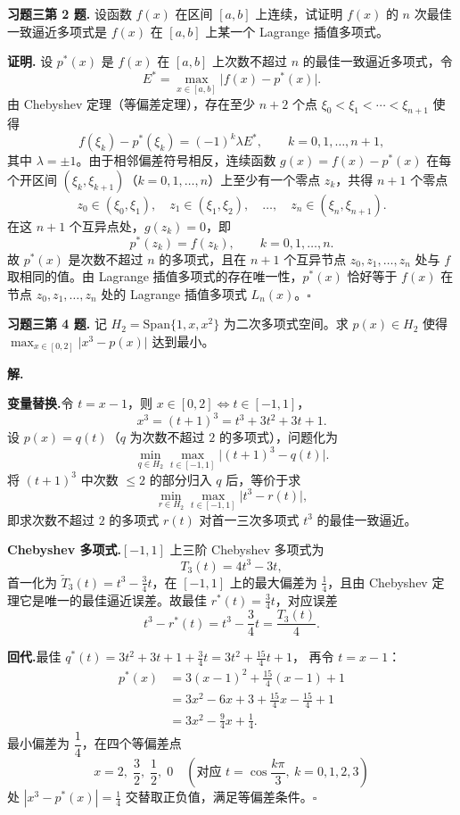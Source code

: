 \documentclass[UTF8,a4paper,11pt]{ctexart}
\newcommand*{\QED}{\hfill\ensuremath{\square}}
\begin{document}
\noindent\textbf{习题三\quad 第 2 题.}\quad
设函数 $f(x)$ 在区间 $[a,b]$ 上连续，试证明 $f(x)$ 的 $n$ 次最佳一致逼近多项式是 $f(x)$ 在 $[a,b]$ 上某一个 Lagrange 插值多项式。

\medskip
\noindent\textbf{证明.}\quad
设 $p^*(x)$ 是 $f(x)$ 在 $[a,b]$ 上次数不超过 $n$ 的最佳一致逼近多项式，令
\[
  E^*=\max_{x\in[a,b]}\bigl|f(x)-p^*(x)\bigr|.
\]
由 Chebyshev 定理（等偏差定理），存在至少 $n+2$ 个点 $\xi_0<\xi_1<\cdots<\xi_{n+1}$ 使得
\[
  f(\xi_k)-p^*(\xi_k)=(-1)^k\lambda E^*,\qquad k=0,1,\ldots,n+1,
\]
其中 $\lambda=\pm 1$。由于相邻偏差符号相反，连续函数 $g(x)=f(x)-p^*(x)$ 在每个开区间 $(\xi_k,\xi_{k+1})$（$k=0,1,\ldots,n$）上至少有一个零点 $z_k$，共得 $n+1$ 个零点
\[
  z_0\in(\xi_0,\xi_1),\quad z_1\in(\xi_1,\xi_2),\quad\ldots,\quad z_n\in(\xi_n,\xi_{n+1}).
\]
在这 $n+1$ 个互异点处，$g(z_k)=0$，即
\[
  p^*(z_k)=f(z_k),\qquad k=0,1,\ldots,n.
\]
故 $p^*(x)$ 是次数不超过 $n$ 的多项式，且在 $n+1$ 个互异节点 $z_0,z_1,\ldots,z_n$ 处与 $f$ 取相同的值。由 Lagrange 插值多项式的存在唯一性，$p^*(x)$ 恰好等于 $f(x)$ 在节点 $z_0,z_1,\ldots,z_n$ 处的 Lagrange 插值多项式 $L_n(x)$。\QED

\bigskip\bigskip

\noindent\textbf{习题三\quad 第 4 题.}\quad
记 $H_2=\mathrm{Span}\{1,x,x^2\}$ 为二次多项式空间。求 $p(x)\in H_2$ 使得
$\max_{x\in[0,2]}\bigl|x^3-p(x)\bigr|$ 达到最小。

\medskip
\noindent\textbf{解.}\quad

\noindent\textbf{变量替换.}\quad 令 $t=x-1$，则 $x\in[0,2]\Leftrightarrow t\in[-1,1]$，
\[
  x^3=(t+1)^3=t^3+3t^2+3t+1.
\]
设 $p(x)=q(t)$（$q$ 为次数不超过 $2$ 的多项式），问题化为
\[
  \min_{q\in H_2}\max_{t\in[-1,1]}\bigl|(t+1)^3-q(t)\bigr|.
\]
将 $(t+1)^3$ 中次数 $\leqslant 2$ 的部分归入 $q$ 后，等价于求
\[
  \min_{r\in H_2}\max_{t\in[-1,1]}\bigl|t^3-r(t)\bigr|,
\]
即求次数不超过 $2$ 的多项式 $r(t)$ 对首一三次多项式 $t^3$ 的最佳一致逼近。

\medskip
\noindent\textbf{Chebyshev 多项式.}\quad $[-1,1]$ 上三阶 Chebyshev 多项式为
\[
  T_3(t)=4t^3-3t,
\]
首一化为 $\widetilde{T}_3(t)=t^3-\tfrac{3}{4}t$，在 $[-1,1]$ 上的最大偏差为 $\tfrac{1}{4}$，且由 Chebyshev 定理它是唯一的最佳逼近误差。故最佳 $r^*(t)=\tfrac{3}{4}t$，对应误差
\[
  t^3-r^*(t)=t^3-\frac{3}{4}t=\frac{T_3(t)}{4}.
\]

\medskip
\noindent\textbf{回代.}\quad 最佳 $q^*(t)=3t^2+3t+1+\tfrac{3}{4}t=3t^2+\tfrac{15}{4}t+1$，
再令 $t=x-1$：
\begin{align*}
  p^*(x)&=3(x-1)^2+\frac{15}{4}(x-1)+1\\
        &=3x^2-6x+3+\frac{15}{4}x-\frac{15}{4}+1\\
        &=\boxed{3x^2-\frac{9}{4}x+\frac{1}{4}}.
\end{align*}
最小偏差为 $\dfrac{1}{4}$，在四个等偏差点
\[
  x=2,\;\frac{3}{2},\;\frac{1}{2},\;0
  \quad\left(\text{对应 }t=\cos\frac{k\pi}{3},\ k=0,1,2,3\right)
\]
处 $|x^3-p^*(x)|=\tfrac{1}{4}$ 交替取正负值，满足等偏差条件。\QED
\end{document}
